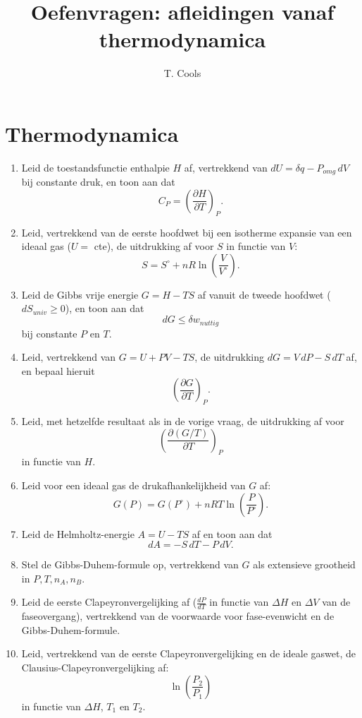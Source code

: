 \documentclass[11pt]{article}
\title{Oefenvragen: afleidingen vanaf thermodynamica}
\author{T. Cools}
\date{}
\begin{document}
\maketitle

\section*{Thermodynamica}

\begin{enumerate}[label=\textbf{\arabic*.}, leftmargin=1.5cm]

\item Leid de toestandsfunctie enthalpie $H$ af, vertrekkend van $dU = \delta q - P_{omg}\,dV$ bij constante druk, en toon aan dat
\[
C_P = \left(\frac{\partial H}{\partial T}\right)_P.
\]

\item Leid, vertrekkend van de eerste hoofdwet bij een isotherme expansie van een ideaal gas ($U = $ cte), de uitdrukking af voor $S$ in functie van $V$:
\[
S = S^\circ + nR\ln\left(\frac{V}{V^\circ}\right).
\]

\item Leid de Gibbs vrije energie $G = H - TS$ af vanuit de tweede hoofdwet ($dS_{univ} \geq 0$), en toon aan dat
\[
dG \leq \delta w_{nuttig}
\]
bij constante $P$ en $T$.

\item Leid, vertrekkend van $G = U + PV - TS$, de uitdrukking $dG = V\,dP - S\,dT$ af, en bepaal hieruit
\[
\left(\frac{\partial G}{\partial T}\right)_P.
\]

\item Leid, met hetzelfde resultaat als in de vorige vraag, de uitdrukking af voor
\[
\left(\frac{\partial (G/T)}{\partial T}\right)_P
\]
in functie van $H$.

\item Leid voor een ideaal gas de drukafhankelijkheid van $G$ af:
\[
G(P) = G(P^\circ) + nRT\ln\left(\frac{P}{P^\circ}\right).
\]

\item Leid de Helmholtz-energie $A = U - TS$ af en toon aan dat
\[
dA = -S\,dT - P\,dV.
\]

\item Stel de Gibbs-Duhem-formule op, vertrekkend van $G$ als extensieve grootheid in $P, T, n_A, n_B$.

\item Leid de eerste Clapeyronvergelijking af ($\frac{dP}{dT}$ in functie van $\Delta H$ en $\Delta V$ van de faseovergang), vertrekkend van de voorwaarde voor fase-evenwicht en de Gibbs-Duhem-formule.

\item Leid, vertrekkend van de eerste Clapeyronvergelijking en de ideale gaswet, de Clausius-Clapeyronvergelijking af:
\[
\ln\left(\frac{P_2}{P_1}\right)
\]
in functie van $\Delta H$, $T_1$ en $T_2$.

\end{enumerate}
\end{document}
